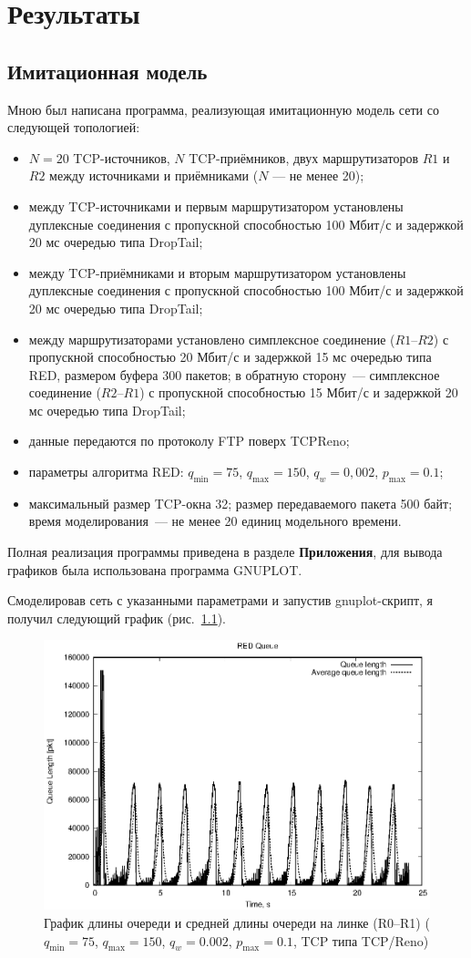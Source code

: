 \chapter{Результаты}

\section{Имитационная модель}

Мною был написана программа, реализующая имитационную модель сети со следующей топологией:
\begin{itemize}
\item $N=20$ TCP-источников, $N$ TCP-приёмников, двух маршрутизаторов $R1$
  и $R2$ между источниками и приёмниками ($N$ — не менее 20);
\item между TCP-источниками и первым маршрутизатором установлены
  дуплексные соединения с пропускной способностью 100 Мбит/с и
  задержкой 20 мс очередью типа DropTail;
\item между TCP-приёмниками и вторым маршрутизатором установлены
  дуплексные соединения с пропускной способностью 100 Мбит/с и
  задержкой 20 мс очередью типа DropTail;
\item между маршрутизаторами установлено симплексное соединение
  ($R1$--$R2$) с пропускной способностью 20 Мбит/с и задержкой 15 мс
  очередью типа RED, размером буфера 300 пакетов; в обратную сторону~---
  симплексное соединение ($R2$--$R1$) с пропускной способностью 15 Мбит/с и
  задержкой 20 мс очередью типа DropTail;
\item данные передаются по протоколу FTP поверх TCPReno;
\item параметры алгоритма RED: $q_{\min}=75$, $q_{\max}=150$, $q_w=0,002$, $p_{\max}=0.1$;
\item максимальный размер TCP-окна 32; размер передаваемого пакета 500
  байт; время моделирования~--- не менее 20 единиц модельного времени.
\end{itemize}

Полная реализация программы приведена в разделе \textbf{Приложения},
для вывода графиков была использована программа GNUPLOT.

Смоделировав сеть с указанными параметрами и запустив gnuplot-скрипт,
я получил следующий график (рис.~\ref{fig:3.1}).

\begin{figure}[!ht]
  \centering
  \includegraphics[width=0.6\linewidth]{image/queues_75-150_classic.eps}
  \caption{График длины очереди и средней длины очереди на
    линке (R0--R1) ($q_{\min}=75$, $q_{\max}=150$, $q_w=0.002$, $p_{\max}=0.1$,
    TCP типа TCP/Reno)}
  \label{fig:3.1}
\end{figure}

